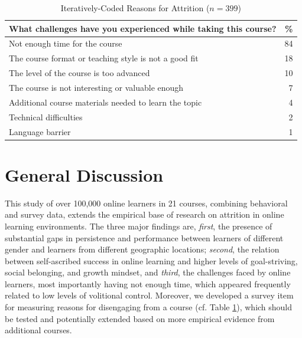 \documentclass{sigchi}\usepackage[]{graphicx}\usepackage[]{color}
\begin{document}
\begin{table}
\caption{Iteratively-Coded Reasons for Attrition ($n=399$)}
\label{tab:s2reas}
\small
\center
\begin{tabular}{lr}
\toprule
What challenges have you experienced while taking this course?  & \% \\
\midrule
Not enough time for the course & 84 \\
The course format or teaching style is not a good fit & 18 \\
The level of the course is too advanced & 10 \\
The course is not interesting or valuable enough & 7 \\
Additional course materials needed to learn the topic & 4 \\
Technical difficulties & 2 \\
Language barrier & 1 \\
\bottomrule
\end{tabular}
\end{table}

\section{General Discussion}

This study of over 100,000 online learners in 21 courses, combining behavioral and survey data, extends the empirical base of research on attrition in online learning environments. The three major findings are, \emph{first}, the presence of substantial gaps in persistence and performance between learners of different gender and learners from different geographic locations; \emph{second}, the relation between self-ascribed success in online learning and higher levels of goal-striving, social belonging, and growth mindset, and \emph{third}, the challenges faced by online learners, most importantly having not enough time, which appeared frequently related to low levels of volitional control. Moreover, we developed a survey item for measuring reasons for disengaging from a course (cf. Table \ref{tab:s2reas}), which should be tested and potentially extended based on more empirical evidence from additional courses.
\end{document}
